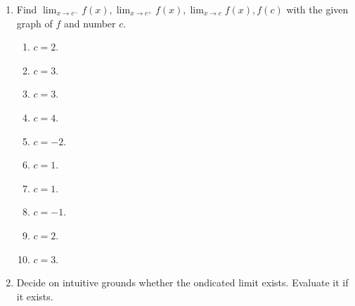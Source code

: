\documentclass[11pt]{book}
\theoremstyle{break}
\theoremstyle{no_label}
\numberwithin{equation}{section}
\begin{document}
\begin{enumerate}[label=\arabic*.]
    \item Find $\displaystyle\lim_{x\to c^-}f(x), \lim_{x\to c^+}f(x), \lim_{x\to c}f(x), f(c)$ with the given graph of $f$ and number $c$.
    \begin{enumerate}
        \item $c=2$.
        \item $c=3$.
        \item $c=3$.
        \item $c=4$.
        \item $c=-2$.
        \item $c=1$.
        \item $c=1$.
        \item $c=-1$.
        \item $c=2$.
        \item $c=3$.
    \end{enumerate}
    \item Decide on intuitive grounds whether the ondicated limit exists. Evaluate it if it exists.
\end{enumerate}
\end{document}
